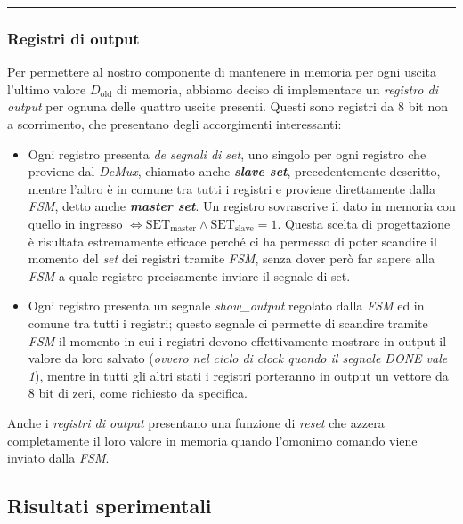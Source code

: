 \begin{center}\rule{0.5\linewidth}{0.5pt}\end{center}

\hypertarget{registri-di-output}{%
\subsubsection{Registri di output}\label{registri-di-output}}

Per permettere al nostro componente di mantenere in memoria per ogni
uscita l'ultimo valore \(D_\text{old}\) di memoria, abbiamo deciso di
implementare un \emph{registro di output} per ognuna delle quattro
uscite presenti. Questi sono registri da 8 bit non a scorrimento, che
presentano degli accorgimenti interessanti:

\begin{itemize}
\tightlist
\item
  Ogni registro presenta \emph{de segnali di set}, uno singolo per ogni
  registro che proviene dal \emph{DeMux}, chiamato anche
  \textbf{\emph{slave set}}, precedentemente descritto, mentre l'altro è
  in comune tra tutti i registri e proviene direttamente dalla
  \emph{FSM}, detto anche \textbf{\emph{master set}}. Un registro
  sovrascrive il dato in memoria con quello in ingresso
  \(\iff\text{SET}_\text{master}\land\text{SET}_\text{slave}=1\). Questa
  scelta di progettazione è risultata estremamente efficace perché ci ha
  permesso di poter scandire il momento del \emph{set} dei registri
  tramite \emph{FSM}, senza dover però far sapere alla \emph{FSM} a
  quale registro precisamente inviare il segnale di set.
\item
  Ogni registro presenta un segnale \emph{show\_output} regolato dalla
  \emph{FSM} ed in comune tra tutti i registri; questo segnale ci
  permette di scandire tramite \emph{FSM} il momento in cui i registri
  devono effettivamente mostrare in output il valore da loro salvato
  (\emph{ovvero nel ciclo di clock quando il segnale DONE vale 1}),
  mentre in tutti gli altri stati i registri porteranno in output un
  vettore da 8 bit di zeri, come richiesto da specifica.
\end{itemize}

Anche i \emph{registri di output} presentano una funzione di
\emph{reset} che azzera completamente il loro valore in memoria quando
l'omonimo comando viene inviato dalla \emph{FSM}.

\pagebreak

\hypertarget{risultati-sperimentali}{%
\subsection{Risultati sperimentali}\label{risultati-sperimentali}}

